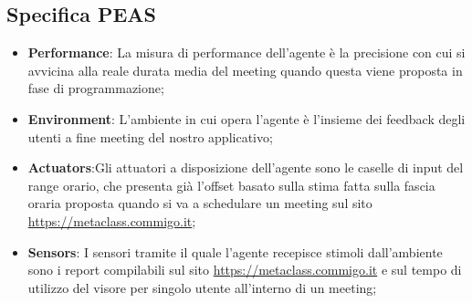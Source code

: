 \subsection{Specifica PEAS}
\fancyhead{}    %
\par{
\begin{itemize}
    \item \textbf{Performance}: La misura di performance dell'agente è la precisione con cui si avvicina alla reale durata media del meeting quando questa viene proposta in fase di programmazione;
    \item \textbf{Environment}: L'ambiente in cui opera l'agente è l'insieme dei feedback degli utenti a fine meeting del nostro applicativo;
    \item \textbf{Actuators}:Gli attuatori a disposizione dell'agente sono le caselle di input del range orario, che presenta già l'offset basato sulla stima fatta sulla fascia oraria proposta quando si va a schedulare un meeting sul sito \url{https://metaclass.commigo.it};
    \item \textbf{Sensors}: I sensori tramite il quale l'agente recepisce stimoli dall'ambiente sono i report compilabili sul sito \url{https://metaclass.commigo.it} e sul tempo di utilizzo del visore per singolo utente all'interno di un meeting;
\end{itemize}
}

